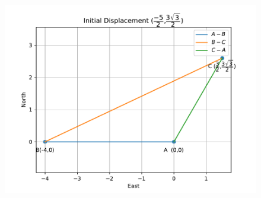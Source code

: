 \documentclass[12pt]{article}
\begin{document}
\begin{enumerate}
\begin{figure}[!h] 
 \begin{center} 
 \includegraphics[width=\columnwidth]{figs/fig.pdf} 
 \end{center} 
\caption{} 
\label{fig:Fig1} 
\end{figure}
\end{enumerate}
\end{document}

